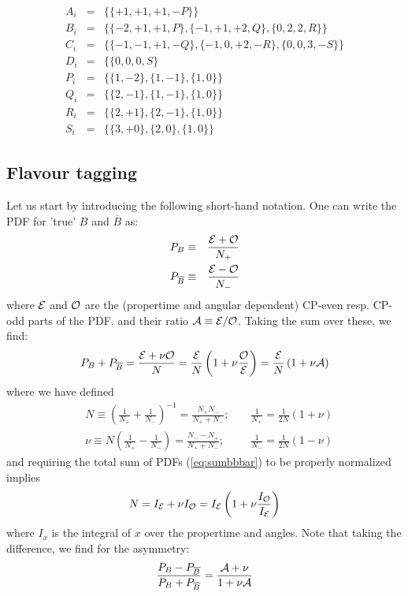 \documentclass[a4paper,10pt,twosided]{article}
\begin{document}
\begin{eqnarray*}
    A_i &=& \{ \{ +1,+1,+1, -P \} \}
 \\ B_i &=& \{ \{ -2,+1,+1, P \}, \{-1,+1,+2, Q \}, \{ 0,2,2,R\} \}
 \\ C_i &=& \{ \{ -1,-1,+1, -Q \}, \{-1,0,+2, -R\},\{0,0,3,-S \}\}
 \\ D_i &=& \{ \{ 0,0,0, S \}
 \\ P_i &=& \{ \{1,-2\},\{1,-1\},\{1,0\} \}
 \\ Q_i &=& \{ \{2,-1\},\{1,-1\},\{1,0\} \}
 \\ R_i &=& \{ \{2,+1\},\{2,-1\},\{1,0\} \}
 \\ S_i &=& \{ \{3,+0\},\{2,0\},\{1,0\} \}
\end{eqnarray*}



\pagebreak
\subsection{Flavour tagging}

Let us start by introducing the following short-hand notation. One can write the 
PDF for 'true' $B$ and $\overline{B}$ as:
\begin{eqnarray}
   P_{B}           &\equiv&\frac{ {\cal E} + {\cal O}}{N_+} \\
   P_{\overline{B}} &\equiv&\frac{ {\cal E} - {\cal O}}{N_-}
\end{eqnarray}
where ${\cal E}$ and ${\cal O}$ are the (propertime and angular dependent) CP-even resp. CP-odd parts of the PDF.
and their ratio ${\cal A} \equiv {\cal E / O }$.
Taking the sum over these, we find:
\begin{equation}
   P_{B} + P_{\overline{B}} =  \frac{ {\cal E} + \nu{\cal O} }{N}  = \frac{\cal E} {N} \left( 1 + \nu \frac{ \cal O }{\cal E} \right) = \frac{\cal E}{N} \left(1 + \nu {\cal A}\right)
   \label{eq:sumbbbar}
\end{equation}
where we have defined
\begin{eqnarray}
   &  N \equiv \left( \frac{1}{N_+}+\frac{1}{N_-}\right)^{-1} = \frac{N_+N_-}{N_+ + N_-};\;\;\;\; &  \frac{1}{N_+} =\frac{1}{2N}(1+\nu) \\
   &\nu \equiv N \left( \frac{1}{N_+}-\frac{1}{N_-}\right) = \frac{N_- - N_+}{N_+ +N_-}; & \frac{1}{N_-} =\frac{1}{2N}(1-\nu) 
\end{eqnarray}
and requiring the total sum of PDFs (\ref{eq:sumbbbar}) to be properly normalized implies
\begin{equation}
   N = I_{\cal E} + \nu I_{\cal O} 
     = I_{\cal E} \left( 1 + \nu \frac{ I_{\cal O}}{I_{\cal E}}   \right)
\end{equation}
where $I_x$ is the integral of $x$ over the propertime and angles.
Note that taking the difference, we find for the asymmetry:
\begin{equation}
  \frac{P_{B} - P_{\overline{B}}}{P_{B} + P_{\overline{B}}} =  \frac{ {\cal A} + \nu}{1+\nu{\cal A}}
   \label{eq:difbbbar}
\end{equation}
\end{document}
